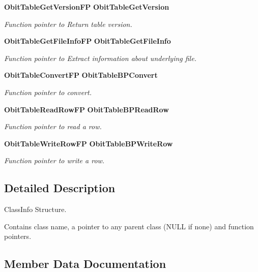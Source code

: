 \begin{CompactItemize}
{\bf Obit\-Table\-Get\-Version\-FP} {\bf Obit\-Table\-Get\-Version}
\begin{CompactList}\small\item\em Function pointer to Return table version. \item\end{CompactList}\item 
{\bf Obit\-Table\-Get\-File\-Info\-FP} {\bf Obit\-Table\-Get\-File\-Info}
\begin{CompactList}\small\item\em Function pointer to Extract information about underlying file. \item\end{CompactList}\item 
{\bf Obit\-Table\-Convert\-FP} {\bf Obit\-Table\-BPConvert}
\begin{CompactList}\small\item\em Function pointer to convert. \item\end{CompactList}\item 
{\bf Obit\-Table\-Read\-Row\-FP} {\bf Obit\-Table\-BPRead\-Row}
\begin{CompactList}\small\item\em Function pointer to read a row. \item\end{CompactList}\item 
{\bf Obit\-Table\-Write\-Row\-FP} {\bf Obit\-Table\-BPWrite\-Row}
\begin{CompactList}\small\item\em Function pointer to write a row. \item\end{CompactList}\end{CompactItemize}


\subsection{Detailed Description}
Class\-Info Structure. 

Contains class name, a pointer to any parent class (NULL if none) and function pointers. 



\subsection{Member Data Documentation}
